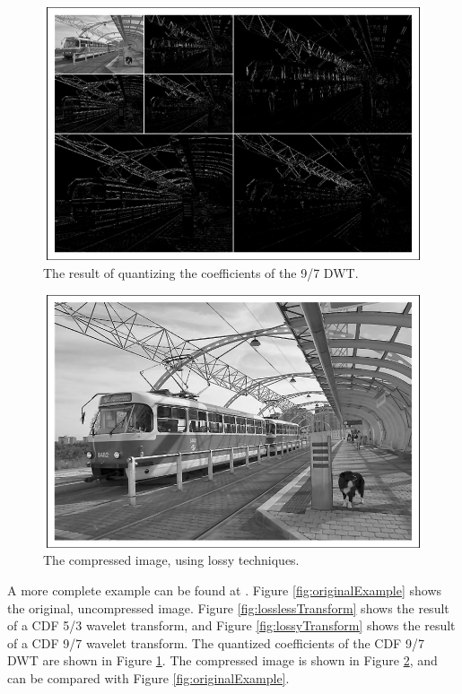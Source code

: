 \documentclass[titlepage,12pt]{article}
\begin{document}
\begin{figure}
	\centering
	\includegraphics[scale=0.35]{resources/example/exampleQuant.png}
	\caption{The result of quantizing the coefficients of the 9/7 DWT.}
	\label{fig:exampleQuant}
\end{figure}
\begin{figure}
	\centering
	\includegraphics[scale=0.35]{resources/example/exampleCompressed.png}
	\caption{The compressed image, using lossy techniques.}
	\label{fig:exampleCompressed}
\end{figure}

A more complete example can be found at \cite{whydomath}.
Figure \ref{fig:originalExample} shows the original, uncompressed image.
Figure \ref{fig:losslessTransform} shows the result of a CDF 5/3 wavelet transform,
and Figure \ref{fig:lossyTransform} shows the result of a CDF 9/7 wavelet transform.
The quantized coefficients of the CDF 9/7 DWT are shown in Figure \ref{fig:exampleQuant}.
The compressed image is shown in Figure \ref{fig:exampleCompressed}, 
and can be compared with Figure \ref{fig:originalExample}.
\end{document}
